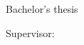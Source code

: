 \begin{titlepage}
    \begin{center}
        \vspace*{1cm}
        
        \Huge
        \textbf{\thesisTitle}
        
        \vspace{1cm}
        \LARGE
    
        \textbf{\name \surname}
        
        \vfill

        Bachelor's thesis
        
        \Large
    
        Supervisor: \supervisor

        \vspace{1.8cm}
        
        \textbf{\university}\\
        \department\\
        \location \thesisYear
        
    \end{center}
    
\end{titlepage}